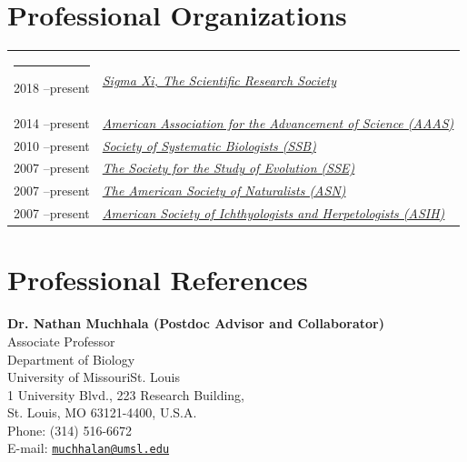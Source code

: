 \documentclass[margin,line]{res}
\begin{document}
\begin{resume}

\section{\sc Professional Organizations}
\begin{longtable}{@{}p{0.7in}p{4in}}\rule{-1mm}{4.5mm}
\hspace*{-4mm} 2018 --present  & \href{https://www.sigmaxi.org}{\textit{Sigma Xi, The Scientific Research Society}}\\*
\hspace*{-4mm} 2014 --present  & \href{https://www.aaas.org}{\textit{American Association for the Advancement of Science (AAAS)}}\\*
\hspace*{-4mm} 2010 --present  & \href{https://www.systbio.org}{\textit{Society of Systematic Biologists (SSB)}}\\*
\hspace*{-4mm} 2007 --present  & \href{https://www.evolutionsociety.org/}{\textit{The Society for the Study of Evolution (SSE)}}\\*
\hspace*{-4mm} 2007 --present  & \href{https://www.amnat.org/home.html/}{\textit{The American Society of Naturalists (ASN)}}\\*
\hspace*{-4mm} 2007 --present  & \href{https://asih.org}{\textit{American Society of Ichthyologists and Herpetologists (ASIH)}}\\*
\end{longtable}



\newpage

\section{\sc Professional References}
\textbf{Dr. Nathan Muchhala (Postdoc Advisor and Collaborator)} \\
Associate Professor \\
Department of Biology \\
University of Missouri\textendash St. Louis \\
1 University Blvd., 223 Research Building, \\
St. Louis, MO 63121-4400, U.S.A. \\
Phone: (314) 516-6672	 \\
E-mail: \href{mailto:muchhalan@umsl.edu}{\tt muchhalan@umsl.edu} \\


\end{resume}
\end{document}
